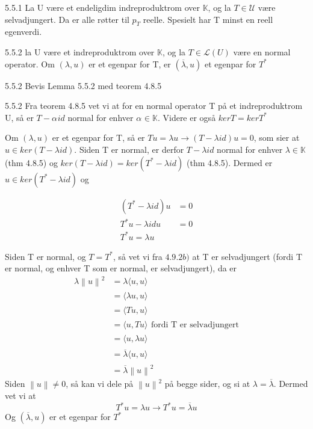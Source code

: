 \documentclass[a4paper,norsk]{article}
\begin{document}
\begin{lemmabox}{5.5.1}{}
La U være et endeligdim indreproduktrom over $ \mathbb{K} $, og la $ T \in \mathcal{U} $ være selvadjungert. Da er alle røtter til $ p_T $ reelle. Spesielt har T minst en reell egenverdi.  
\end{lemmabox}

\begin{lemmabox}{5.5.2}{}
la U være et indreproduktrom over $ \mathbb{K}$, og la $ T \in \mathcal{L}(U) $ være en normal operator. Om $ \left( \lambda , u \right)  $ er et egenpar for T, er $ \left( \overline{ \lambda }, u \right)  $ et egenpar for $ T^* $ 
\end{lemmabox}

\begin{oppgavebox}{5.5.2}{}
Bevis Lemma 5.5.2 med teorem 4.8.5

\begin{proofbox}{5.5.2}{}
Fra teorem 4.8.5 vet vi at for en normal operator T på et indreproduktrom U, så er $ T - \alpha_{}^{} id $ normal for enhver $ \alpha_{}^{} \in \mathbb{K} $. Videre er også $ kerT = ker T^* $


Om $ \left( \lambda , u \right)  $  er et egenpar for T, så er $ Tu = \lambda u \rightarrow \left( T - \lambda id \right)u = 0 $, som sier at $ u \in ker \left( T - \lambda id \right)  $. Siden T er normal, er derfor $ T - \lambda id $ normal for enhver $ \lambda \in \mathbb{K} $ (thm 4.8.5) og $ ker \left( T - \lambda id \right) = ker \left( T^* - \lambda id \right)   $ (thm 4.8.5). Dermed er $ u \in ker \left( T^* - \lambda id \right)  $ og 

\begin{align*}
    \left( T^* - \lambda id \right) u &= 0\\
    T^*u - \lambda id u &= 0 \\
    T^*u = \lambda u
\end{align*}

Siden T er normal, og $ T=T^* $, så vet vi fra $ 4.9.2 b)  $ at T er selvadjungert (fordi T er normal, og enhver T som er normal, er selvadjungert), da er 
\begin{align*}
    \lambda \left\lVert u \right\rVert ^2 &= \lambda \langle u, u \rangle_{  } \\
    &= \langle \lambda  u ,u  \rangle_{  }  \\
    &= \langle Tu, u \rangle_{  } \\
    &= \langle u, Tu \rangle_{  } \text{ fordi T er selvadjungert}\\
    &= \langle u, \lambda u \rangle_{  } \\
    &= \overline{ \lambda } \langle u, u \rangle_{  } \\
    &= \overline{ \lambda } \left\lVert u \right\rVert ^2
\end{align*}
Siden $ \left\lVert u \right\rVert \neq 0 $, så kan vi dele på $ \left\lVert u \right\rVert ^2 $  på begge sider, og si at $ \lambda = \overline{ \lambda } $. Dermed vet vi at 
\[
    T^* u = \lambda u \rightarrow T^* u = \overline{ \lambda }u
\]
Og $ \left( \overline{ \lambda }, u \right)  $  er et egenpar for $ T^* $ 
\end{proofbox}
\end{oppgavebox}
\end{document}
